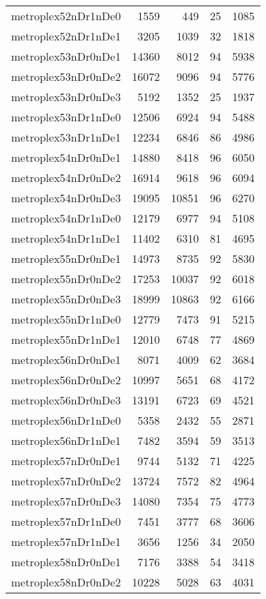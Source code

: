 \begin{longtable}{lrrrr}
metroplex52nDr1nDe0 & 1559 & 449 & 25 & 1085 \\
metroplex52nDr1nDe1 & 3205 & 1039 & 32 & 1818 \\
metroplex53nDr0nDe1 & 14360 & 8012 & 94 & 5938 \\
metroplex53nDr0nDe2 & 16072 & 9096 & 94 & 5776 \\
metroplex53nDr0nDe3 & 5192 & 1352 & 25 & 1937 \\
metroplex53nDr1nDe0 & 12506 & 6924 & 94 & 5488 \\
metroplex53nDr1nDe1 & 12234 & 6846 & 86 & 4986 \\
metroplex54nDr0nDe1 & 14880 & 8418 & 96 & 6050 \\
metroplex54nDr0nDe2 & 16914 & 9618 & 96 & 6094 \\
metroplex54nDr0nDe3 & 19095 & 10851 & 96 & 6270 \\
metroplex54nDr1nDe0 & 12179 & 6977 & 94 & 5108 \\
metroplex54nDr1nDe1 & 11402 & 6310 & 81 & 4695 \\
metroplex55nDr0nDe1 & 14973 & 8735 & 92 & 5830 \\
metroplex55nDr0nDe2 & 17253 & 10037 & 92 & 6018 \\
metroplex55nDr0nDe3 & 18999 & 10863 & 92 & 6166 \\
metroplex55nDr1nDe0 & 12779 & 7473 & 91 & 5215 \\
metroplex55nDr1nDe1 & 12010 & 6748 & 77 & 4869 \\
metroplex56nDr0nDe1 & 8071 & 4009 & 62 & 3684 \\
metroplex56nDr0nDe2 & 10997 & 5651 & 68 & 4172 \\
metroplex56nDr0nDe3 & 13191 & 6723 & 69 & 4521 \\
metroplex56nDr1nDe0 & 5358 & 2432 & 55 & 2871 \\
metroplex56nDr1nDe1 & 7482 & 3594 & 59 & 3513 \\
metroplex57nDr0nDe1 & 9744 & 5132 & 71 & 4225 \\
metroplex57nDr0nDe2 & 13724 & 7572 & 82 & 4964 \\
metroplex57nDr0nDe3 & 14080 & 7354 & 75 & 4773 \\
metroplex57nDr1nDe0 & 7451 & 3777 & 68 & 3606 \\
metroplex57nDr1nDe1 & 3656 & 1256 & 34 & 2050 \\
metroplex58nDr0nDe1 & 7176 & 3388 & 54 & 3418 \\
metroplex58nDr0nDe2 & 10228 & 5028 & 63 & 4031 \\

\end{longtable}
